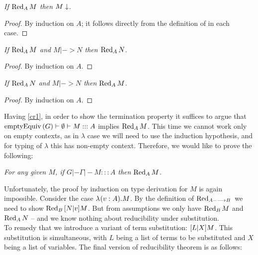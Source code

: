 \begin{lemma}[CR1]\em
\label{cr1}
If $\Red{M}{A}$ then $\termin{M}$.
\begin{proof}
By induction on $A$; it follows directly from the definition of  in each case.
\end{proof}
\end{lemma}

\begin{lemma}[CR2]\em
If $\Red{M}{A}$ and $ M |-> N$ then $\Red{N}{A}$.
\begin{proof}
By induction on $A$.
\end{proof}
\end{lemma}

\begin{lemma}[CR3]\em
\label{cr3}
If $\Red{N}{A}$ and $ M |-> N$ then $\Red{M}{A}$.
\begin{proof}
By induction on $A$.
\end{proof}
\end{lemma}

Having \ref{cr1}, in order to show the termination property it suffices to argue that $\emptyEq G |- \nnil |- M ::: A$ implies $\Red{M}{A}$.  This time we cannot work only on empty contexts, as in $\lambda$ case we will need to use the induction hypothesis, and for typing of $\lambda$ this has non-empty context. Therefore, we would like to prove the following:
\begin{introtheorem}\em
For any given $M$, if $G |- \Gamma |- M ::: A$ then $\Red{M}{A}$.
\end{introtheorem}

Unfortunately, the proof by induction on type derivation for $M$ is again impossible.  Consider the case $\lam{v}{A}{M}$. By the definition of $\Red{}{A--->B}$ we need to show  $\Red{\substt{N}{v}{M}}{B}$. But from assumptions we  only have $\Red{M}{B}$ and $\Red{N}{A}$ -- and we know nothing about reducibility under substitution.\\

To remedy that we introduce a variant of term substitution: $\substt{L}{X}{M}$. This substitution is simultaneous, with $L$ being a list of terms to be substituted and $X$ being a list of variables. The final version of reducibility theorem is as follows:

